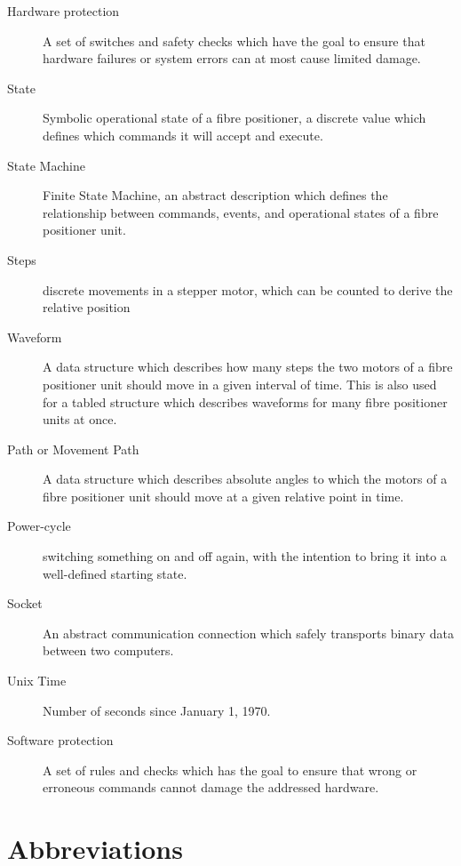\documentclass[fontsize=12,a4paper]{scrreprt}
\begin{document}
\begin{description}
\item[Hardware protection] A set of switches and safety checks which
  have the goal to ensure that hardware failures or system errors can
  at most cause limited damage.

\item[State] Symbolic operational state of a fibre positioner, a
  discrete value which defines which commands it will accept and
  execute.

\item[State Machine] Finite State Machine, an abstract description
  which defines the relationship between commands, events, and
  operational states of a fibre positioner unit.

\item[Steps] discrete movements in a stepper motor, which can be
  counted to derive the relative position

\item[Waveform] A data structure which describes how many steps the
  two motors of a fibre positioner unit should move in a given
  interval of time. This is also used for a tabled structure which
  describes waveforms for many fibre positioner units at once.

\item[Path or Movement Path] A data structure which describes
  absolute angles to which the motors of a fibre positioner unit
  should move at a given relative point in time.

\item[Power-cycle] switching something on and off again, with the
  intention to bring it into a well-defined starting state.

\item[Socket] An abstract communication connection which safely
  transports binary data between two computers.

\item[Unix Time] Number of seconds since January 1, 1970.

\item[Software protection] A set of rules and checks which has the
  goal to ensure that wrong or erroneous commands cannot damage
  the addressed hardware.
\end{description}

\chapter{Abbreviations}
\end{document}
